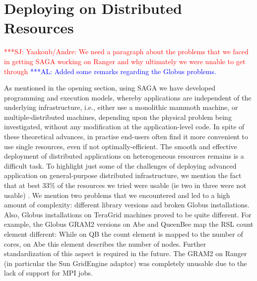\documentclass[conference,final]{IEEEtran}
\newcommand{\up}{\vspace*{-1em}}
\newcommand{\alnote}[1]{ {\textcolor{blue} { ***AL: #1 }}}
\newcommand{\jhanote}[1]{ {\textcolor{red} { ***SJ: #1 }}}
\newcommand{\alnote}[1]{}
\newcommand{\jhanote}[1]{}
\begin{document}
\up

\section{Deploying on Distributed Resources}

\up

\jhanote{Yaakoub/Andre: We need a paragraph about the problems that we
  faced in getting SAGA working on Ranger and why ultimately we were
  unable to get through} \alnote{Added some remarks regarding the
  Globus problems.}

As mentioned in the opening section, using SAGA we have developed
programming and execution models, whereby applications are independent
of the underlying infrastructure, i.e., either use a monolithic
mammoth machine, or multiple-distributed machines, depending upon the
physical problem being investigated, without any modification at the
application-level code. In spite of these theoretical advances, in
practise end-users often find it more convenient to use single
resources, even if not optimally-efficient.  The smooth and effective
deployment of distributed applications on heterogeneous resources
remains is a difficult task.  To highlight just some of the challenges
of deploying advanced application on general-purpose distributed
infrastructure, we mention the fact that at best 33\% of the resources
we tried were usable (ie two in three were not usable) .  We mention
two problems that we encountered and led to a high amount of
complexity: different library versions and broken Globus
installations.  Also, Globus installations on TeraGrid machines proved
to be quite different.  For example, the Globus GRAM2 versions on Abe
and QueenBee map the RSL count element different: While on QB the
count element is mapped to the number of cores, on Abe this element
describes the number of nodes. Further standardization of this aspect
is required in the future. The GRAM2 on Ranger (in particular the Sun
GridEngine adaptor) was completely unusable due to the lack of support
for MPI jobs.

\end{document}
